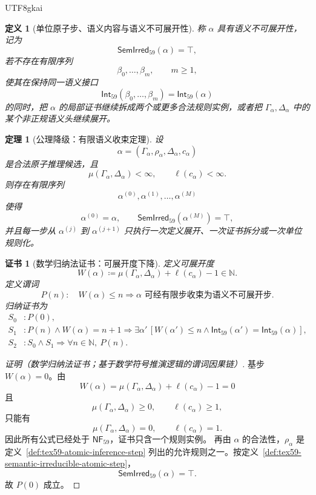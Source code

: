 \documentclass[12pt]{article}
\newtheorem{definition}{定义}[section]
\newtheorem{theorem}{定理}[section]
\newtheorem{Certificate}{证书}[section]
\newcommand{\NN}{\mathbb{N}}
\newcommand{\DefEq}{\coloneqq}
\begin{document}
\begin{CJK*}{UTF8}{gkai}
\begin{definition}[单位原子步、语义内容与语义不可展开性]
称 \(\alpha\) 具有语义不可展开性，记为
\[
  \mathsf{SemIrred}_{59}(\alpha)=\top,
\]
若不存在有限序列
\[
  \beta_0,\ldots,\beta_m,
  \qquad m\ge1,
\]
使其在保持同一语义接口
\[
  \mathsf{Int}_{59}(\beta_0,\ldots,\beta_m)
  =
  \mathsf{Int}_{59}(\alpha)
\]
的同时，把 \(\alpha\) 的局部证书继续拆成两个或更多合法规则实例，或者把
\(\Gamma_{\alpha},\Delta_{\alpha}\) 中的某个非正规语义头继续展开。
\end{definition}

\begin{theorem}[公理降级：有限语义收束定理]
\label{thm:tex59-finite-semantic-contraction}
设
\[
  \alpha=(\Gamma_{\alpha},\rho_{\alpha},\Delta_{\alpha},c_{\alpha})
\]
是合法原子推理候选，且
\[
  \mu(\Gamma_{\alpha},\Delta_{\alpha})<\infty,
  \qquad
  \ell(c_{\alpha})<\infty.
\]
则存在有限序列
\[
  \alpha^{(0)},\alpha^{(1)},\ldots,\alpha^{(M)}
\]
使得
\[
  \alpha^{(0)}=\alpha,
  \qquad
  \mathsf{SemIrred}_{59}(\alpha^{(M)})=\top,
\]
并且每一步从 \(\alpha^{(j)}\) 到 \(\alpha^{(j+1)}\) 只执行一次定义展开、一次证书拆分或一次单位规则化。
\end{theorem}

\begin{Certificate}[数学归纳法证书：可展开度下降]
\label{cert:tex59-finite-semantic-contraction}
定义可展开度
\[
  W(\alpha)
  \DefEq
  \mu(\Gamma_{\alpha},\Delta_{\alpha})
  +
  \ell(c_{\alpha})-1
  \in\NN.
\]
定义谓词
\[
  P(n):\quad
  W(\alpha)\le n
  \Rightarrow
  \alpha\text{ 可经有限步收束为语义不可展开步}.
\]
归纳证书为
\[
\begin{aligned}
  S_0 &: P(0),\\
  S_1 &: P(n)\wedge W(\alpha)=n+1
         \Rightarrow
         \exists\alpha'\,[W(\alpha')\le n
         \wedge
         \mathsf{Int}_{59}(\alpha')=\mathsf{Int}_{59}(\alpha)],\\
  S_2 &: S_0\wedge S_1
         \Rightarrow
         \forall n\in\NN,\ P(n).
\end{aligned}
\]
\end{Certificate}

\begin{proof}[证明（数学归纳法证书；基于数学符号推演逻辑的谓词因果链）]
基步 \(W(\alpha)=0\)。由
\[
  W(\alpha)
  =
  \mu(\Gamma_{\alpha},\Delta_{\alpha})
  +
  \ell(c_{\alpha})-1
  =
  0
\]
且
\[
  \mu(\Gamma_{\alpha},\Delta_{\alpha})\ge0,
  \qquad
  \ell(c_{\alpha})\ge1,
\]
只能有
\[
  \mu(\Gamma_{\alpha},\Delta_{\alpha})=0,
  \qquad
  \ell(c_{\alpha})=1.
\]
因此所有公式已经处于 \(\mathsf{NF}_{59}\)，证书只含一个规则实例。
再由 \(\alpha\) 的合法性，\(\rho_{\alpha}\) 是定义~\ref{def:tex59-atomic-inference-step}
列出的允许规则之一。按定义~\ref{def:tex59-semantic-irreducible-atomic-step}，
\[
  \mathsf{SemIrred}_{59}(\alpha)=\top.
\]
故 \(P(0)\) 成立。


\end{proof}
\end{CJK*}
\end{document}
